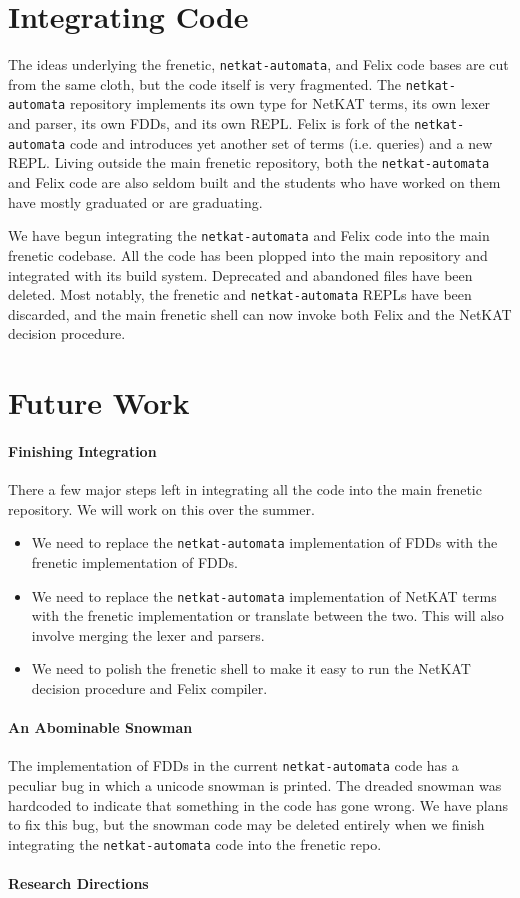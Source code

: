\documentclass{hw}
\newcommand{\netauto}{\texttt{netkat-automata}}
\begin{document}
\section{Integrating Code}
The ideas underlying the frenetic, \netauto{}, and Felix code bases are cut
from the same cloth, but the code itself is very fragmented. The \netauto{}
repository implements its own type for NetKAT terms, its own lexer and parser,
its own FDDs, and its own REPL. Felix is fork of the \netauto{} code and
introduces yet another set of terms (i.e. queries) and a new REPL. Living
outside the main frenetic repository, both the \netauto{} and Felix code are
also seldom built and the students who have worked on them have mostly
graduated or are graduating.

We have begun integrating the \netauto{} and Felix code into the main frenetic
codebase. All the code has been plopped into the main repository and integrated
with its build system. Deprecated and abandoned files have been deleted. Most
notably, the frenetic and \netauto{} REPLs have been discarded, and the main
frenetic shell can now invoke both Felix and the NetKAT decision procedure.

\section{Future Work}
\paragraph{Finishing Integration}
There a few major steps left in integrating all the code into the main frenetic
repository. We will work on this over the summer.
\begin{itemize}
  \item
    We need to replace the \netauto{} implementation of FDDs with the frenetic
    implementation of FDDs.
  \item
    We need to replace the \netauto{} implementation of NetKAT terms with the
    frenetic implementation or translate between the two. This will also
    involve merging the lexer and parsers.
  \item
    We need to polish the frenetic shell to make it easy to run the NetKAT
    decision procedure and Felix compiler.
\end{itemize}

\paragraph{An Abominable Snowman}
The implementation of FDDs in the current \netauto{} code has a peculiar bug in
which a unicode snowman is printed. The dreaded snowman was hardcoded to
indicate that something in the code has gone wrong. We have plans to fix this
bug, but the snowman code may be deleted entirely when we finish integrating
the \netauto{} code into the frenetic repo.

\paragraph{Research Directions}
\end{document}
